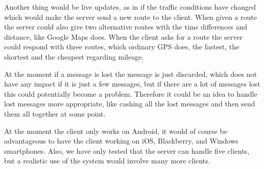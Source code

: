 Another thing would be live updates, as in if the traffic conditions have changed which would make the server send a new route to the client. When given a route the server could also give two alternative routes with the time differences and distance, like Google Maps does.
When the client asks for a route the server could respond with three routes, which ordinary GPS does, the fastest, the shortest and the cheapest regarding  mileage.

At the moment if a message is lost the message is just discarded, which does not have any impact if it is just a few messages, but if there are a lot of messages lost this could potentially become a problem. Therefore it could be an idea to handle lost messages more appropriate, like cashing all the lost messages and then send them all together at some point.

At the moment the client only works on Android, it would of course be advantageous to have the client working on iOS, Blackberry, and Windows smartphones. Also, we have only tested that the server can handle five clients, but a realistic use of the system would involve many more clients.